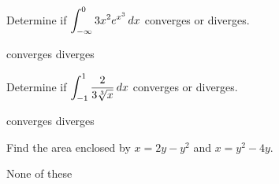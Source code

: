 \documentclass[12pt]{exam}
\newcommand{\ds}{\ensuremath{\displaystyle}}
\begin{document}
\begin{center}
\end{center}
\vspace{0.1in}

\begin{questions}

\setcounter{question}{0}
\question[10]
Determine if $\ds\int_{-\infty}^0 3x^2e^{x^3} \, dx$ converges or diverges.

\begin{checkboxes}
\CorrectChoice converges
\choice diverges
\end{checkboxes}

\vfill

\question[10]
Determine if $\ds \int_{-1}^1 \frac{2}{3\sqrt[3]{x}} \, dx$ converges or diverges.

\begin{checkboxes}
\choice converges
\CorrectChoice diverges
\end{checkboxes}

\vfill

\question[10]
Find the area enclosed by $x = 2y-y^2$ and $x = y^2-4y$.

\begin{checkboxes}
\choice None of these
\end{checkboxes}

\vfill

\end{questions}
\end{document}
